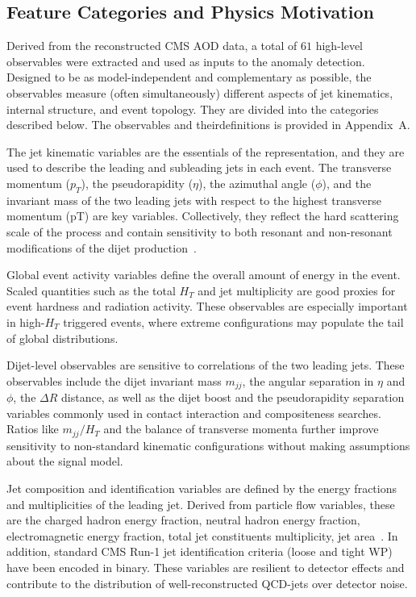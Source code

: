\documentclass[11pt,a4paper,twocolumn]{article}
\begin{document}
\subsection{Feature Categories and Physics Motivation}

Derived from the reconstructed CMS AOD data, a total of $61$ high-level observables were extracted and used as inputs to the anomaly detection. Designed to be as model-independent and complementary as possible, the observables measure (often simultaneously) different aspects of jet kinematics, internal structure, and event topology. They are divided into the categories described below. The observables and theirdefinitions is provided in Appendix~A.

The jet kinematic variables are the essentials of the representation, and they are used to describe the leading and subleading jets in each event. The transverse momentum ($p_T$), the pseudorapidity ($\eta$), the azimuthal angle ($\phi$), and the invariant mass of the two leading jets with respect to the highest transverse momentum (pT) are key variables. Collectively, they reflect the hard scattering scale of the process and contain sensitivity to both resonant and non-resonant modifications of the dijet production~\cite{Cacciari2008AntiKt,Salam2010Jetography}.

Global event activity variables define the overall amount of energy in the event. Scaled quantities such as the total $H_T$ and jet multiplicity are good proxies for event hardness and radiation activity. These observables are especially important in high-$H_T$ triggered events, where extreme configurations may populate the tail of global distributions.

Dijet-level observables are sensitive to correlations of the two leading jets. These observables include the dijet invariant mass $m_{jj}$, the angular separation in $\eta$ and $\phi$, the $\Delta R$ distance, as well as the dijet boost and the pseudorapidity separation variables commonly used in contact interaction and compositeness searches. Ratios like $m_{jj}/H_T$ and the balance of transverse momenta further improve sensitivity to non-standard kinematic configurations without making assumptions about the signal model.

Jet composition and identification variables are defined by the energy fractions and multiplicities of the leading jet. Derived from particle flow variables, these are the charged hadron energy fraction, neutral hadron energy fraction, electromagnetic energy fraction, total jet constituents multiplicity, jet area~\cite{Cacciari2008Pileup}. In addition, standard CMS Run-1 jet identification criteria (loose and tight WP) have been encoded in binary. These variables are resilient to detector effects and contribute to the distribution of well-reconstructed QCD-jets over detector noise.
\end{document}
